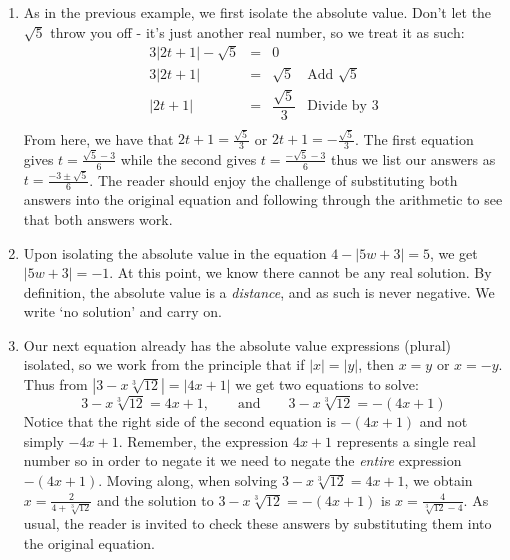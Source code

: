 \documentclass{ximera}
\begin{document}
\begin{example}
\begin{enumerate}
\[\begin{array}{rclr}
\end{array} \] At this point, we have $y+5 = 1$ or $y+5 = -1$, so our solutions are $y = -4$ or $y = -6$.  We leave it to the reader to check both answers in the original equation.

\item As in the previous example, we first isolate the absolute value.  Don't let the $\sqrt{5}$ throw you off - it's just another real number, so we treat it as such:\[ \begin{array}{rclr}

 3|2t+1| - \sqrt{5} & = & 0 & \\
 3|2t+1|  & = &  \sqrt{5} & \text{Add $\sqrt{5}$} \\
 |2t + 1| & = & \dfrac{\sqrt{5}}{3} & \text{Divide by $3$}\\
\end{array} \] From here, we have that $2t+1 = \frac{\sqrt{5}}{3}$ or $2t+1 = -\frac{\sqrt{5}}{3}$. The first equation gives $t = \frac{\sqrt{5}-3}{6}$ while the second gives $t = \frac{-\sqrt{5}-3}{6}$ thus we list our answers as $t = \frac{-3 \pm \sqrt{5}}{6}$.   The reader should enjoy the challenge of substituting both answers into the original equation and following through the arithmetic to see that both answers work.

\item  Upon isolating the absolute value in the equation $4 - |5w+3| = 5$, we get $|5w+3| = -1$.  At this point, we know there cannot be any real solution.  By definition, the absolute value is a \textit{distance}, and as such is never negative.  We write `no solution' and carry on.

\item Our next equation already has the absolute value expressions (plural) isolated, so we work from the principle that if $|x| = |y|$, then $x = y$ or $x = -y$. Thus from $\left|3 - x \sqrt[3]{12}\right| = |4x+1|$ we get two equations to solve:  \[ 3 - x \sqrt[3]{12} = 4x+1, \qquad \text{and} \qquad 3 - x \sqrt[3]{12} = -(4x+1) \] Notice that the right side of the second equation is $-(4x+1)$ and not simply $-4x+1$.  Remember, the expression $4x+1$ represents a single real number so in order to negate it we need to negate the \textit{entire} expression $-(4x+1)$. Moving along, when solving $3 - x \sqrt[3]{12} = 4x+1$, we obtain $x = \frac{2}{4 + \sqrt[3]{12}}$ and the solution to $3 - x \sqrt[3]{12} = -(4x+1)$ is $x = \frac{4}{\sqrt[3]{12}-4}$.  As usual, the reader is invited to check these answers by substituting them into the original equation.


\end{enumerate}
\end{example}
\end{document}
